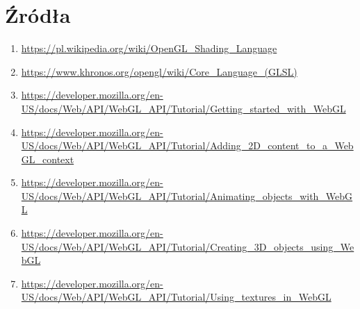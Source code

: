 \documentclass{article}
\begin{document}
    \section{Źródła}
        \begin{enumerate}[label=\arabic*.]
            \item \url{https://pl.wikipedia.org/wiki/OpenGL_Shading_Language}
            \item \url{https://www.khronos.org/opengl/wiki/Core_Language_(GLSL)}
            \item \url{https://developer.mozilla.org/en-US/docs/Web/API/WebGL_API/Tutorial/Getting_started_with_WebGL}
            \item \url{https://developer.mozilla.org/en-US/docs/Web/API/WebGL_API/Tutorial/Adding_2D_content_to_a_WebGL_context}
            \item \url{https://developer.mozilla.org/en-US/docs/Web/API/WebGL_API/Tutorial/Animating_objects_with_WebGL}
            \item \url{https://developer.mozilla.org/en-US/docs/Web/API/WebGL_API/Tutorial/Creating_3D_objects_using_WebGL}
            \item \url{https://developer.mozilla.org/en-US/docs/Web/API/WebGL_API/Tutorial/Using_textures_in_WebGL}
        \end{enumerate}
\end{document}
